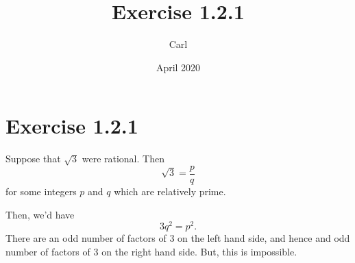\documentclass{article}
\title{Exercise 1.2.1}
\author{Carl}
\date{April 2020}
\begin{document}
\maketitle

\section{Exercise 1.2.1}
Suppose that $\sqrt{3}$ were rational.  Then $$\sqrt{3}=\frac{p}{q}$$ for some integers $p$ and $q$ which are relatively prime.

Then, we'd have $$3q^2=p^2.$$
There are an odd number of factors of 3 on the left hand side, and hence and odd number of factors of 3 on the right hand side.  But, this is impossible.
\end{document}
